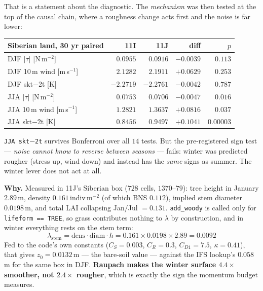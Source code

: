 \documentclass[10pt]{article}
\begin{document}
That is a statement about the diagnostic. The \emph{mechanism} was then tested at the top
of the causal chain, where a roughness change acts first and the noise is far lower:

\begin{center}\footnotesize
\begin{tabular}{lrrrr}
\toprule
Siberian land, 30 yr paired & 11I & 11J & diff & $p$ \\
\midrule
DJF $|\tau|$ [N\,m$^{-2}$]  & $0.0955$ & $0.0916$ & $-0.0039$ & $0.113$ \\
DJF 10\,m wind [m\,s$^{-1}$]& $2.1282$ & $2.1911$ & $+0.0629$ & $0.253$ \\
DJF skt${-}$2t [K]          & $-2.2719$& $-2.2761$& $-0.0042$ & $0.787$ \\
JJA $|\tau|$ [N\,m$^{-2}$]  & $0.0753$ & $0.0706$ & $-0.0047$ & $0.016$ \\
JJA 10\,m wind [m\,s$^{-1}$]& $1.2821$ & $1.3637$ & $+0.0816$ & $0.037$ \\
JJA skt${-}$2t [K]          & $0.8456$ & $0.9497$ & $\mathbf{+0.1041}$ & $\mathbf{0.00003}$ \\
\bottomrule
\end{tabular}
\end{center}

\texttt{JJA skt}${-}$\texttt{2t} survives Bonferroni over all $14$ tests. But the
pre-registered sign test --- \emph{noise cannot know to reverse between seasons} --- fails:
winter was predicted rougher (stress up, wind down) and instead has the \emph{same} signs
as summer. The winter lever does not act at all.

\textbf{Why.} Measured in 11J's Siberian box ($728$ cells, $1370$--$79$): tree height in
January $\mathbf{2.89}$\,m, density $0.161$\,indiv\,m$^{-2}$ (of which BNS $0.112$),
implied stem diameter $0.0198$\,m, and total LAI collapsing Jan/Jul $=0.131$.
\texttt{add\_woody} is called only for \texttt{lifeform == TREE}, so grass contributes
nothing to $\lambda$ by construction, and in winter everything rests on the stem term:
\[
\lambda_{\text{stem}} = \text{dens}\cdot\text{diam}\cdot h
 = 0.161\times0.0198\times2.89 = \mathbf{0.0092}
\]
Fed to the code's own constants ($C_S{=}0.003$, $C_R{=}0.3$, $C_{D1}{=}7.5$,
$\kappa{=}0.41$), that gives $z_0 = \mathbf{0.0132}$\,m --- the bare-soil value --- against
the IFS lookup's $0.058$\,m for the same box in DJF. \textbf{Raupach makes the winter
surface $4.4\times$ smoother, not $2.4\times$ rougher}, which is exactly the sign the
momentum budget measures.
\end{document}
